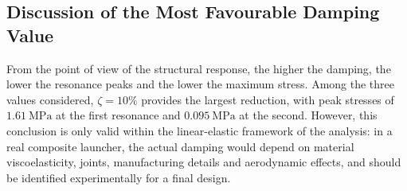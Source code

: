 \subsection{Discussion of the Most Favourable Damping Value}

From the point of view of the structural response, the higher the damping, the lower the resonance peaks and the lower the maximum stress. Among the three values considered, $\zeta = 10\%$ provides the largest reduction, with peak stresses of $\SI{1.61}{\mega\pascal}$ at the first resonance and $\SI{0.095}{\mega\pascal}$ at the second. However, this conclusion is only valid within the linear-elastic framework of the analysis: in a real composite launcher, the actual damping would depend on material viscoelasticity, joints, manufacturing details and aerodynamic effects, and should be identified experimentally for a final design.
